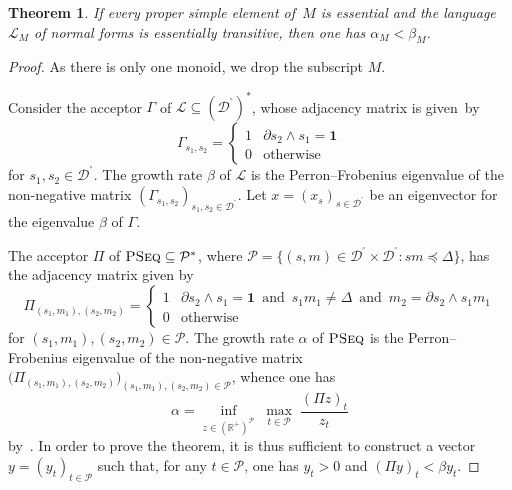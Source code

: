 \documentclass[a4paper,final]{article}
\theoremstyle{plain}
\newtheorem{theorem}{Theorem}
\theoremstyle{remark}
\theoremstyle{definition}
\begin{document}
\begin{theorem}\label{T:BoundedExpectedPD}
If every proper simple element of~$M$ is essential and the language~${\mathcal{L}}_M$ of normal forms is essentially transitive, then one has $\alpha_M<\beta_M$.
\end{theorem}
\begin{proof}
As there is only one monoid, we drop the subscript $M$.

Consider the acceptor ${\Gamma}$ of ${\mathcal{L}} \subseteq ({{\mathcal{D}}^{\!{}^{\circ}\!}})^*$, whose adjacency matrix is given~by
\[
 {\Gamma}_{s_1,s_2} = \begin{cases}
                         1 & \partial s_2\wedge s_1 = {\mathbf{1}} \\
                         0 & \text{otherwise}
                       \end{cases}
\]
for $s_1,s_2\in{{\mathcal{D}}^{\!{}^{\circ}\!}}$.  The growth rate $\beta$ of ${\mathcal{L}}$ is the Perron--Frobenius eigenvalue of the non-negative matrix $({\Gamma}_{s_1,s_2})_{s_1,s_2\in{{\mathcal{D}}^{\!{}^{\circ}\!}}}$.
Let $x = (x_s)_{s\in{{\mathcal{D}}^{\!{}^{\circ}\!}}}$ be an eigenvector for the eigenvalue $\beta$ of ${\Gamma}$.

The acceptor ${\Pi}$ of ${\textsc{PSeq}} \subseteq \mathcal{P}^*$, where $\mathcal{P}=\{(s,m)\in{{\mathcal{D}}^{\!{}^{\circ}\!}}\times{{\mathcal{D}}^{\!{}^{\circ}\!}} : sm\preccurlyeq\Delta\}$, has the adjacency matrix given by
\[
 {\Pi}_{(s_1,m_1),(s_2,m_2)} = \begin{cases}
                         1 & \partial s_2\wedge s_1 = {\mathbf{1}}
                             \,\text{ and }\, s_1m_1\ne \Delta
                             \,\text{ and }\, m_2 = \partial s_2\wedge s_1m_1 \\
                         0 & \text{otherwise}
                       \end{cases}
\]
for $(s_1,m_1),(s_2,m_2)\in\mathcal{P}$.  The growth rate $\alpha$ of ${\textsc{PSeq}}$ is the Perron--Frobenius eigenvalue of the non-negative matrix $\big({\Pi}_{(s_1,m_1),(s_2,m_2)}\big)_{(s_1,m_1),(s_2,m_2)\in\mathcal{P}}$, whence one has
\[
   \alpha = \inf_{z\in({\mathbb{R}}^+)^{\mathcal{P}}} \;
               \max_{t\in\mathcal{P}} \;
                  \frac{({\Pi} z)_t}{z_t}
\]
by~\cite[Theorem~3.1]{TamWu89}.
In order to prove the theorem, it is thus sufficient to construct a vector
$y = (y_t)_{t\in\mathcal{P}}$ such that, for any 
$t\in\mathcal{P}$, one has $y_t>0$ and $(\Pi y)_t < \beta y_t$.


\end{proof}
\end{document}
